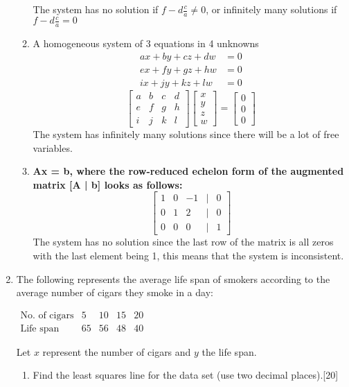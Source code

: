 \documentclass[11pt]{article}
\begin{document}
\begin{enumerate}
\begin{enumerate}
    The system has no solution if \(f - d\frac{c}{a} \neq 0\), or infinitely many solutions if \(f - d\frac{c}{a} = 0\)
  
        
    \item A homogeneous system of 3 equations in 4 unknowns
    \[
        \begin{aligned}
            ax + by + cz + dw &= 0 \\
            ex + fy + gz + hw &= 0 \\
            ix + jy + kz + lw &= 0
        \end{aligned}
    \]
    \[
        \begin{bmatrix}
            a & b & c & d \\
            e & f & g & h \\
            i & j & k & l
        \end{bmatrix}
        \begin{bmatrix}
            x \\
            y \\
            z \\
            w
        \end{bmatrix}
        = \begin{bmatrix}
            0 \\
            0 \\
            0
        \end{bmatrix}
    \]
    The system has infinitely many solutions since there will be a lot of free variables.
    \item \textbf{Ax = b, where the row-reduced echelon form of the augmented matrix [A | b] looks as follows:}
    \[
        \begin{bmatrix}
            1 & 0 & -1 &|& 0 \\
            0 & 1 & 2 &|& 0 \\
            0 & 0 & 0 &|& 1
        \end{bmatrix}
    \]
    The system has no solution since the last row of the matrix is all zeros with the last element being 1, this means that the system is inconsistent.
\end{enumerate}

\item The following represents the average life span of  smokers according to the average number of cigars they smoke in a day:
\begin{center}
$%
\begin{array}{ccccc}
\text{No. of cigars} & 5 & 10 & 15 & 20
\\
\text{Life span} & 65 & 56 & 48 & 40 %
\end{array}%
$
\end{center}
Let $x$ represent the number of cigars and $y$ the life span.
\begin{enumerate}
\item Find the least squares line for the data set (use two decimal places).\hfill[20]


\end{enumerate}
\end{enumerate}
\end{document}
